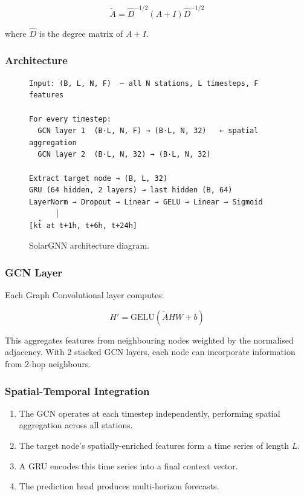 \documentclass[11pt,a4paper]{article}
\begin{document}
\begin{equation}
    \tilde{A} = \hat{D}^{-1/2}(A + I)\hat{D}^{-1/2}
\end{equation}

where $\hat{D}$ is the degree matrix of $A + I$.

\subsubsection{Architecture}

\begin{figure}[H]
\centering
\begin{verbatim}
Input: (B, L, N, F)  — all N stations, L timesteps, F features

For every timestep:
  GCN layer 1  (B·L, N, F) → (B·L, N, 32)   ← spatial aggregation
  GCN layer 2  (B·L, N, 32) → (B·L, N, 32)

Extract target node → (B, L, 32)
GRU (64 hidden, 2 layers) → last hidden (B, 64)
LayerNorm → Dropout → Linear → GELU → Linear → Sigmoid
      │
[kt̂ at t+1h, t+6h, t+24h]
\end{verbatim}
\caption{SolarGNN architecture diagram.}
\label{fig:gnn_arch}
\end{figure}

\subsubsection{GCN Layer}

Each Graph Convolutional layer computes:

\begin{equation}
    H' = \text{GELU}(\tilde{A} H W + b)
\end{equation}

This aggregates features from neighbouring nodes weighted by the normalised adjacency. With 2 stacked GCN layers, each node can incorporate information from 2-hop neighbours.

\subsubsection{Spatial-Temporal Integration}

\begin{enumerate}[noitemsep]
    \item The GCN operates at each timestep independently, performing spatial aggregation across all stations.
    \item The target node's spatially-enriched features form a time series of length $L$.
    \item A GRU encodes this time series into a final context vector.
    \item The prediction head produces multi-horizon forecasts.
\end{enumerate}
\end{document}
